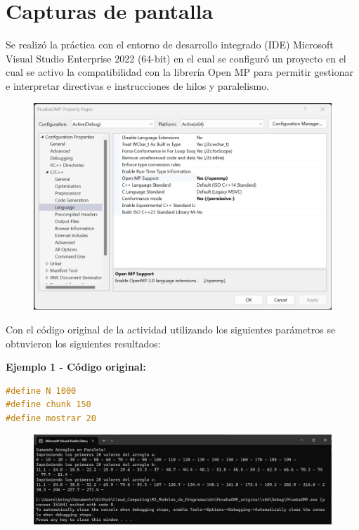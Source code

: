 \documentclass[12pt,a4paper]{article}
\begin{document}
\section{Capturas de pantalla}

Se realizó la práctica con el entorno de desarrollo integrado (IDE) Microsoft Visual Studio Enterprise 2022 (64-bit) en el cual se configuró un proyecto en el cual se activo la compatibilidad con la librería Open MP para permitir gestionar e interpretar directivas e instrucciones de hilos y paralelismo.

\begin{figure}[H]
    \centering
    \includegraphics[width=1\linewidth]{M2_Modelos_de_Programación/reporte/figuras/Configuración_proyecto.png}
    \label{fig:Visual-Studio}
\end{figure}

Con el código original de la actividad utilizando los siguientes parámetros se obtuvieron los siguientes resultados:

\vspace{1em}

\textbf{Ejemplo 1 - Código original:}

\begin{lstlisting}[language=C, numbers=none]
#define N 1000
#define chunk 150
#define mostrar 20
\end{lstlisting}

\begin{figure}[H]
    \centering
    \includegraphics[width=1\linewidth]{M2_Modelos_de_Programación/reporte/figuras/Código_original_ejemplo-1.png}
    \label{fig:Código_original_ejemplo-1}
\end{figure}
\end{document}
